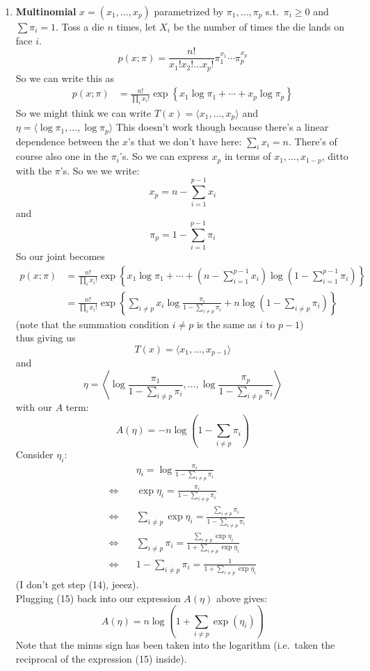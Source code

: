 \documentclass{article}
\begin{document}
\begin{enumerate}
	\item
	\textbf{Multinomial}
	$x = (x_1,\ldots,x_p)$
	parametrized by $\pi_1, \ldots, \pi_p$ s.t.\ $\pi_i\geq 0$ and $\sum \pi_i = 1$.
	Toss a die $n$ times, let $X_i$ be the number of times the die lands on face $i$.
	$$
	p(x;\pi) = 
	\frac{n!}
	{x_1!x_2!\ldots x_p!}
	\pi_1^{x_1}
	\cdots
	\pi_p^{x_p}
	$$
	So we can write this as
	\begin{align}
	p(x;\pi)
	&=
	\frac{n!}  {\prod_i x_i!}
	\exp
	\left\{
		x_1\log\pi_1 + \cdots + 
		x_p \log \pi_p
	\right\}
	\end{align}
	So we might think we can write
	$T(x) = \langle x_1, \ldots, x_p\rangle$
	and
	$\eta = \langle \log \pi_1 ,\ldots, \log\pi_p\rangle$
	This doesn't work though because there's a linear dependence between the $x$'s that we don't
	have here: $\sum_i x_i = n$.
	There's of course also one in the $\pi_i$'s.
	So we can express $x_p$ in terms of $x_1, \ldots, x_{1-p}$, ditto with the $\pi$'s.
	So we we write:
	$$
	x_p = n - \sum_{i=1}^{p-1}x_i
	$$
	and
	$$
	\pi_p = 1 - \sum_{i=1}^{p-1}\pi_i
	$$
	So our joint becomes
	\begin{align}
	p(x;\pi)
	&=
	\frac{n!}  {\prod_i x_i!}
	\exp
	\left\{
		x_1\log\pi_1 + \cdots +
		\left(  n - \sum_{i=1}^{p-1}x_i \right)
		\log \left( 1 - \sum_{i=1}^{p-1}\pi_i \right)
	\right\}
	\\
	&=
	\frac{n!}  {\prod_i x_i!}
	\exp
	\left\{
		\sum_{i\neq p}
		x_i\log \frac{\pi_i}{ 1 - \sum_{i\neq p} \pi_i}
		+
		n \log\left( 
		1 - \sum_{i\neq p}\pi_i
		 \right)
	\right\}
	\end{align}
	(note that the summation condition $i\neq p$ is the same as $i$ to $p-1$) \\
	thus giving us
	$$
	T(x) = \langle x_1, \ldots, x_{p-1}\rangle
	$$
	and
	$$
	\eta = 
	\left\langle
	\log \frac{\pi_1} {1 - \sum_{i\neq p} \pi_i}
	,
	\ldots
	,
	\log \frac{\pi_p} {1 - \sum_{i\neq p} \pi_i}
	\right\rangle
	$$
	with our $A$ term:
	$$
	A(\eta) =
	- n \log
	\left(
	1 - \sum_{i\neq p} \pi_i
	\right)
	$$
	Consider $\eta_i$:
	\begin{align}
	&
	\eta_i
	=
	\log
	\frac{\pi_i} {1 - \sum_{i\neq p} \pi_i}
	\\
	\Leftrightarrow \quad&
	\exp \eta_i
	=
	\frac{\pi_i} {1 - \sum_{i\neq p} \pi_i}
	\\
	\Leftrightarrow \quad&
	\sum_{i\neq p}
	\exp \eta_i
	=
	\frac{\sum_{i\neq p}\pi_i} {1 - \sum_{i\neq p} \pi_i}
	\\
	\Leftrightarrow \quad&
	\sum_{i\neq p}
	\pi_i
	=
	\frac{\sum_{i\neq p}\exp \eta_i} {1 + \sum_{i\neq p} \exp\eta_i}
	\\
	\Leftrightarrow \quad&
	1 - 
	\sum_{i\neq p}
	\pi_i
	=
	\frac{1} {1 + \sum_{i\neq p} \exp\eta_i}
	\end{align}
	(I don't get step (14), jeeez). \\
	Plugging (15) back into our expression $A(\eta)$ above gives:
	$$
	A(\eta)
	=
	n \log \left(
	1 + \sum_{i\neq p} \exp(\eta_i)
	\right)
	$$
	Note that the minus sign has been taken into the logarithm (i.e.~taken the reciprocal of the expression (15) inside).


\end{enumerate}
\end{document}

